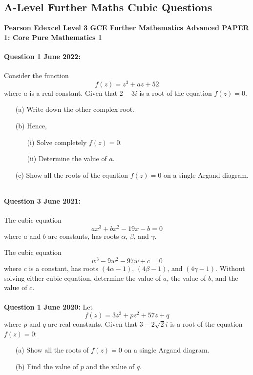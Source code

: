 \documentclass[12pt]{article}
\begin{document}
\subsection{A-Level Further Maths Cubic Questions}
\textbf{Pearson Edexcel Level 3 GCE Further Mathematics
Advanced PAPER 1: Core Pure Mathematics 1}\\\\
\textbf{Question 1 June 2022:}\\\\
Consider the function 
\[f(z) = z^3 + az + 52\]
where \( a \) is a real constant. Given that \( 2 - 3i \) is a root of the equation \( f(z) = 0 \).
\begin{enumerate}
    \item[(a)] Write down the other complex root.
    \item[(b)] Hence,
    \begin{enumerate}
        \item[(i)] Solve completely \( f(z) = 0 \).
        \item[(ii)] Determine the value of \( a \).
    \end{enumerate}
    \item[(c)] Show all the roots of the equation \( f(z) = 0 \) on a single Argand diagram.\\\\
\end{enumerate}

\textbf{Question 3 June 2021:}\\\\
The cubic equation
\[ax^3 + bx^2 - 19x - b = 0\]
where \( a \) and \( b \) are constants, has roots \( \alpha \), \( \beta \), and \( \gamma \).

The cubic equation
\[w^3 - 9w^2 - 97w + c = 0\]
where \( c \) is a constant, has roots \( (4\alpha - 1) \), \( (4\beta - 1) \), and \( (4\gamma - 1) \).
Without solving either cubic equation, determine the value of \( a \), the value of \( b \), and the value of \( c \).\\\\

\textbf{Question 1 June 2020:}
Let 
\[f(z) = 3z^3 + pz^2 + 57z + q\]
where \( p \) and \( q \) are real constants. Given that \( 3 - 2\sqrt{2}i \) is a root of the equation \( f(z) = 0 \):
\begin{enumerate}
    \item[(a)] Show all the roots of \( f(z) = 0 \) on a single Argand diagram.    
    \item[(b)] Find the value of \( p \) and the value of \( q \).\\\\
\end{enumerate}
\end{document}
